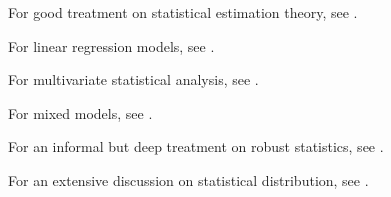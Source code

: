 \begin{refsection}
For good treatment on statistical estimation theory, see \cite{kay1993fundamentals}.


For linear regression models, see \cite{kutner2003applied}\cite{seber2012linear}.

For multivariate statistical analysis, see \cite{johnson2007applied}.

For mixed models, see \cite{mcculloch2001generalized}.

For an informal but deep treatment on robust statistics, see \cite{wilcox2010fundamentals}.

For an extensive discussion on statistical distribution, see \cite{forbes2011statistical}\cite{krishnamoorthy2016handbook}.

\printbibliography
\end{refsection}

